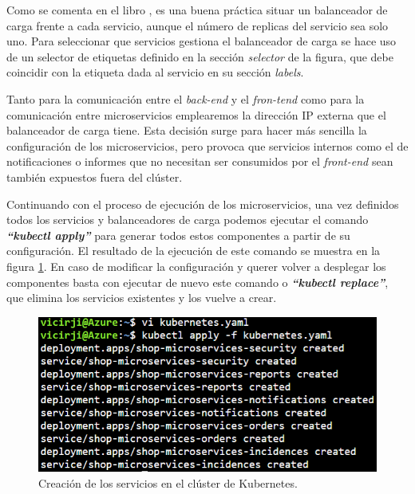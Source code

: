 \documentclass[11pt,spanish,listoffigures]{tfgetsinf}
\begin{document}
Como se comenta en el libro \cite{Rensin2015}, es una buena práctica situar un balanceador de carga frente a cada servicio, aunque el número de replicas del servicio sea solo uno. Para seleccionar que servicios gestiona el balanceador de carga se hace uso de un selector de etiquetas definido en la sección \textit{selector} de la figura, que debe coincidir con la etiqueta dada al servicio en su sección \textit{labels}.

Tanto para la comunicación entre el \textit{back-end} y el \textit{fron-tend} como para la comunicación entre microservicios emplearemos la dirección IP externa que el balanceador de carga tiene. Esta decisión surge para hacer más sencilla la configuración de los microservicios, pero provoca que servicios internos como el de notificaciones o informes que no necesitan ser consumidos por el \textit{front-end} sean también expuestos fuera del clúster.

Continuando con el proceso de ejecución de los microservicios, una vez definidos todos los servicios y balanceadores de carga podemos ejecutar el comando \textit{\textbf{``kubectl apply''}} para generar todos estos componentes a partir de su configuración. El resultado de la ejecución de este comando se muestra en la figura \ref{fig:KubernetesApply}. En caso de modificar la configuración y querer volver a desplegar los componentes basta con ejecutar de nuevo este comando o \textit{\textbf{``kubectl replace''}}, que elimina los servicios existentes y los vuelve a crear.

\begin{figure}[h]
\centering
\includegraphics[scale=0.8]{KubernetesApply}
\caption{Creación de los servicios en el clúster de Kubernetes.}
\label{fig:KubernetesApply}
\end{figure}

\newpage
\end{document}
